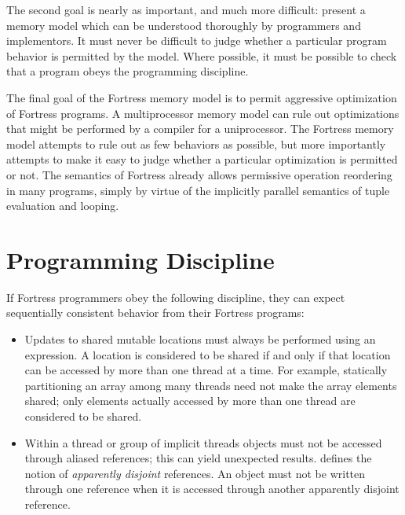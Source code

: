 The second goal is nearly as important, and much more difficult:
present a memory model which can be understood thoroughly by
programmers and implementors.  It must never be difficult to judge
whether a particular program behavior is permitted by the model.
Where possible, it must be possible to check that a program obeys
the programming discipline.

The final goal of the Fortress memory model is to permit aggressive
optimization of Fortress programs.  A multiprocessor memory model can
rule out optimizations that might be performed by a compiler for a
uniprocessor.  The Fortress memory model attempts to rule out as few
behaviors as possible, but more importantly attempts to make it easy
to judge whether a particular optimization is permitted or not.  The
semantics of Fortress already allows permissive operation reordering in
many programs, simply by virtue of the implicitly parallel semantics
of tuple evaluation and looping.

\section{Programming Discipline}

If Fortress programmers obey the following discipline, they can expect
sequentially consistent behavior from their Fortress programs:
\begin{itemize}

\item Updates to shared mutable locations must always be performed using an
   expression.  A location is considered to be shared if
  and only if that location can be accessed by more than one thread at
  a time.  For example, statically partitioning an array among many
  threads need not make the array elements shared; only elements
  actually accessed by more than one thread are considered to be
  shared.

\item Within a thread or group of implicit threads objects must not
  be accessed through aliased references; this can yield unexpected
  results.   defines the notion of \emph{apparently
    disjoint} references.  An object must not be written through one
  reference when it is accessed through another apparently disjoint
  reference.

\end{itemize}

